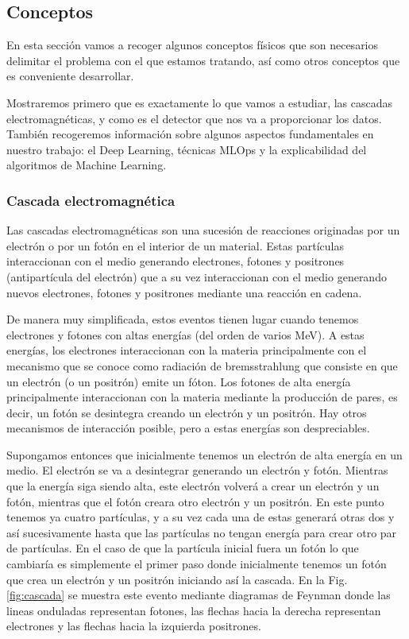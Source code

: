 \documentclass[a4paper,12pt,twoside,titlepage]{article}
\begin{document}
\subsection{Conceptos}
\label{sec:conceptos}

En esta sección vamos a recoger algunos conceptos físicos que son necesarios delimitar el problema con el que estamos tratando, así como otros conceptos que es conveniente desarrollar.

Mostraremos primero que es exactamente lo que vamos a estudiar, las cascadas electromagnéticas, y como es el detector que nos va a proporcionar los datos. También recogeremos información sobre algunos aspectos fundamentales en nuestro trabajo: el Deep Learning, técnicas MLOps y la explicabilidad del algoritmos de Machine Learning.

\subsubsection*{Cascada electromagnética}

Las cascadas electromagnéticas son una sucesión de reacciones originadas por un electrón o por un fotón en el interior de un material. Estas partículas interaccionan con el medio generando electrones, fotones y positrones (antipartícula del electrón) que a su vez interaccionan con el medio generando nuevos electrones, fotones y positrones mediante una reacción en cadena.

De manera muy simplificada, estos eventos tienen lugar cuando tenemos electrones y fotones con altas energías (del orden de varios MeV). A estas energías, los electrones interaccionan con la materia principalmente con el mecanismo que se conoce como radiación de bremsstrahlung que consiste en que un electrón (o un positrón) emite un fóton.
Los fotones de alta energía principalmente interaccionan con la materia mediante la producción de pares, es decir, un fotón se desintegra creando un electrón y un positrón. Hay otros mecanismos de interacción posible, pero a estas energías son despreciables.

Supongamos entonces que inicialmente tenemos un electrón de alta energía en un medio. El electrón se va a desintegrar generando un electrón y fotón. Mientras que la energía siga siendo alta, este electrón volverá a crear un electrón y un fotón, mientras que el fotón creara otro electrón y un positrón. En este punto tenemos ya cuatro partículas, y a su vez cada una de estas generará otras dos y así sucesivamente hasta que las partículas no tengan energía para crear otro par de partículas. En el caso de que la partícula inicial fuera un fotón lo que cambiaría es simplemente el primer paso donde inicialmente tenemos un fotón que crea un electrón y un positrón iniciando así la cascada. En la Fig. \ref{fig:cascada} se muestra este evento mediante diagramas de Feynman donde las lineas onduladas representan fotones, las flechas hacia la derecha representan electrones y las flechas hacia la izquierda positrones.
\end{document}
